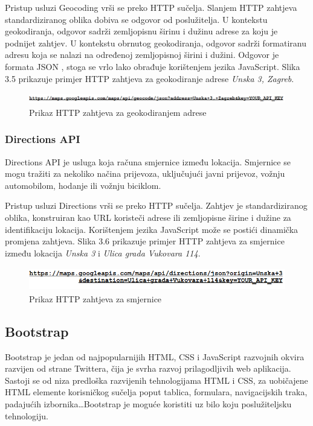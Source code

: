 \documentclass[times, utf8, zavrsni, numeric]{fer}
\begin{document}
Pristup usluzi Geocoding vrši se preko HTTP sučelja. Slanjem HTTP zahtjeva standardiziranog oblika dobiva se odgovor od poslužitelja. U kontekstu geokodiranja, odgovor sadrži zemljopisnu širinu i dužinu adrese za koju je podnijet zahtjev. U kontekstu obrnutog geokodiranja, odgovor sadrži formatiranu adresu koja se nalazi na određenoj zemljopisnoj širini i dužini. Odgovor je formata JSON , stoga se vrlo lako obrađuje korištenjem jezika JavaScript. Slika 3.5 prikazuje primjer HTTP zahtjeva za geokodiranje adrese \emph{Unska 3, Zagreb}.
\begin{figure}[htb]
\centering
\includegraphics[height=0.48cm]{geocoding-api.png}
\caption{Prikaz HTTP zahtjeva za geokodiranjem adrese}
\label{fig:geocodeJs}
\end{figure}
\subsubsection{Directions API}
Directions API je usluga koja računa smjernice između lokacija. Smjernice se mogu tražiti za nekoliko načina prijevoza, uključujući javni prijevoz, vožnju automobilom, hodanje ili vožnju biciklom\cite{GetStart97:online}.

Pristup usluzi Directions vrši se preko HTTP sučelja. Zahtjev je standardiziranog oblika, konstruiran kao URL koristeči adrese ili zemljopisne širine i dužine za identifikaciju lokacija. Korištenjem jezika JavaScript može se postići dinamička promjena zahtjeva. Slika 3.6 prikazuje primjer HTTP zahtjeva za smjernice između lokacija \emph{Unska 3} i \emph{Ulica grada Vukovara 114}.
\begin{figure}[htb]
\includegraphics[height=1cm]{directions-api.png}
\caption{Prikaz HTTP zahtjeva za smjernice}
\label{fig:directionsJs}
\end{figure}
\subsection{Bootstrap}
Bootstrap je jedan od najpopularnijih HTML, CSS  i JavaScript razvojnih okvira razvijen od strane Twittera, čija je svrha razvoj prilagodljivih web aplikacija. Sastoji se od niza predloška  razvijenih tehnologijama HTML i CSS, za uobičajene HTML elemente korisničkog sučelja poput tablica, formulara, navigacijskih traka, padajućih izbornika\ldots Bootstrap je moguće koristiti uz bilo koju poslužiteljsku tehnologiju.
\end{document}
